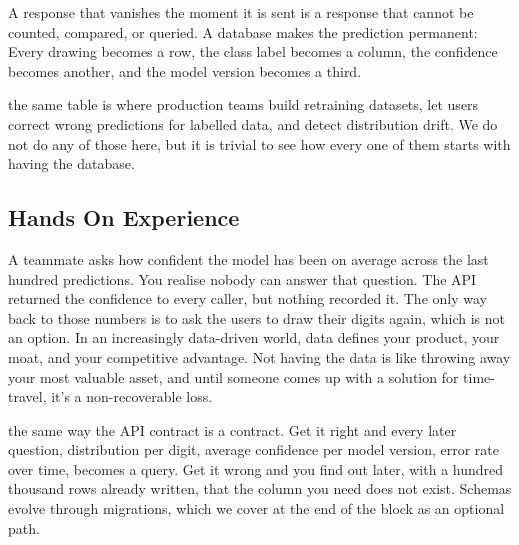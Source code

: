 A response that vanishes the moment it is sent is a response that cannot be
counted, compared, or queried.
A database makes the prediction permanent: Every drawing becomes a row, the
class label becomes a column, the confidence becomes another, and the model
version becomes a third.

the same table is where production teams build retraining datasets, let
users correct wrong predictions for labelled data, and detect distribution
drift.
We do not do any of those here, but it is trivial to see how every one of them starts with having
the database.



\newpage
\subsection{Hands On Experience}

 A teammate asks how confident the
model has been on average across the last hundred predictions.
You realise nobody can answer that question.
The API returned the confidence to every caller, but nothing recorded it.
The only way back to those numbers is to ask the users to draw their digits
again, which is not an option. In an increasingly data-driven world, data defines your product, 
your moat, and your competitive advantage. Not having the data is like throwing away your most valuable asset, and 
until someone comes up with a solution for time-travel, it's a non-recoverable loss.

 the same way the API contract is a
contract.
Get it right and every later question, distribution per digit, average
confidence per model version, error rate over time, becomes a query.
Get it wrong and you find out later, with a hundred thousand rows already
written, that the column you need does not exist. Schemas evolve through
migrations, which we cover at the end of the block as an optional path.


